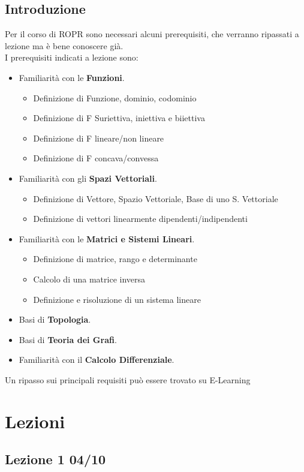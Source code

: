 \documentclass[12pt, a4paper, openany]{book}
\begin{document}
\section{Introduzione}
Per il corso di ROPR sono necessari alcuni prerequisiti, che verranno ripassati a lezione ma è bene conoscere già.
\\I prerequisiti indicati a lezione sono:
\begin{itemize}
    \item Familiarità con le \textbf{Funzioni}.
    \begin{itemize}
        \item Definizione di Funzione, dominio, codominio
        \item Definizione di F Suriettiva, iniettiva e biiettiva
        \item Definizione di F lineare/non lineare
        \item Definizione di F concava/convessa
    \end{itemize}
    \item Familiarità con gli \textbf{Spazi Vettoriali}.
    \begin{itemize}
        \item Definizione di Vettore, Spazio Vettoriale, Base di uno S. Vettoriale
        \item Definizione di vettori linearmente dipendenti/indipendenti
    \end{itemize}
    \item Familiarità con le \textbf{Matrici e Sistemi Lineari}.
    \begin{itemize}
        \item Definizione di matrice, rango e determinante
        \item Calcolo di una matrice inversa
        \item Definizione e risoluzione di un sistema lineare
    \end{itemize}
    \item Basi di \textbf{Topologia}.
    \item Basi di \textbf{Teoria dei Grafi}.
    \item Familiarità con il \textbf{Calcolo Differenziale}.
\end{itemize}
Un ripasso sui principali requisiti può essere trovato su E-Learning

\chapter*{Lezioni}
\section*{Lezione 1 04/10}
\end{document}
